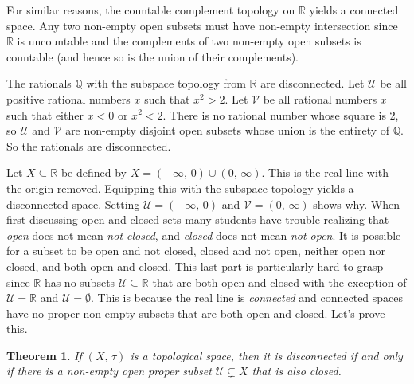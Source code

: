\documentclass{article}
\theoremstyle{plain}
\newtheorem{theorem}{Theorem}[section]
\theoremstyle{normal}
\newenvironment{example}{%
    \pushQED{\qed}\renewcommand{\qedsymbol}{$\blacksquare$}\examplex%
}{%
    \popQED\endexamplex%
}
\begin{document}
        \begin{example}
            For similar reasons, the countable complement topology on
            $\mathbb{R}$ yields a connected space. Any two non-empty open
            subsets must have non-empty intersection since $\mathbb{R}$ is
            uncountable and the complements of two non-empty open subsets is
            countable (and hence so is the union of their complements).
        \end{example}
        \begin{example}
            The rationals $\mathbb{Q}$ with the subspace topology from
            $\mathbb{R}$ are disconnected. Let $\mathcal{U}$ be all positive
            rational numbers $x$ such that $x^{2}>2$. Let $\mathcal{V}$ be
            all rational numbers $x$ such that either $x<0$ or $x^{2}<2$. There
            is no rational number whose square is 2, so $\mathcal{U}$ and
            $\mathcal{V}$ are non-empty disjoint open subsets whose union is
            the entirety of $\mathbb{Q}$. So the rationals are disconnected.
        \end{example}
        \begin{example}
            Let $X\subseteq\mathbb{R}$ be defined by
            $X=(-\infty,\,0)\cup(0,\,\infty)$. This is the real line with the
            origin removed. Equipping this with the subspace topology yields a
            disconnected space. Setting $\mathcal{U}=(-\infty,\,0)$ and
            $\mathcal{V}=(0,\,\infty)$ shows why.
        \end{example}
        When first discussing open and closed sets many students have trouble
        realizing that \textit{open} does not mean \textit{not closed}, and
        \textit{closed} does not mean \textit{not open}. It is possible for a
        subset to be open and not closed, closed and not open, neither open nor
        closed, and both open and closed. This last part is particularly hard to
        grasp since $\mathbb{R}$ has no subsets $\mathcal{U}\subseteq\mathbb{R}$
        that are both open and closed with the exception of
        $\mathcal{U}=\mathbb{R}$ and $\mathcal{U}=\emptyset$. This is because
        the real line is \textit{connected} and connected spaces have no
        proper non-empty subsets that are both open and closed. Let's prove
        this.
        \begin{theorem}
            If $(X,\,\tau)$ is a topological space, then it is disconnected
            if and only if there is a non-empty open proper subset
            $\mathcal{U}\subsetneq{X}$ that is also closed.
        \end{theorem}
\end{document}
